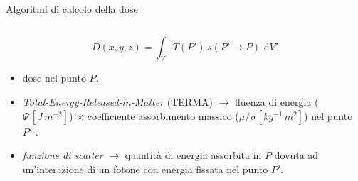 \documentclass{beamer}
\newcommand{\de}{\,\textrm{d}}
\begin{document}
\begin{frame}{Algoritmi di calcolo della dose}
\begin{columns}
\end{columns}
\vspace{.5cm}
\small $$D(x,y,z) = \int_V T(P')\,s(P'\rightarrow P)\, \de V'$$
\begin{itemize}
\scriptsize
\item {} dose nel punto $P$.
\item {} \textit{Total-Energy-Released-in-Matter} (TERMA) $\rightarrow$ fluenza di energia ($\Psi\, [J\, m^{-2}]$) $\times$ coefficiente assorbimento massico ($\mu/\rho\,[kg^{-1}\, m^{2}]$) nel punto $P'$ .
\item {} \textit{funzione di scatter} $\rightarrow$ quantità di energia assorbita in $P$ dovuta ad un'interazione di un fotone con energia fissata nel punto $P'$.
\end{itemize}
\end{frame}
\end{document}
